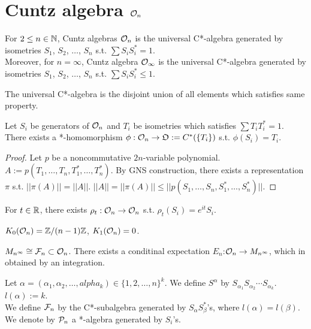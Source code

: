 \section{Cuntz algebra $\O_n$}

\cite{olesen1978some}
\begin{definition}
  For $ 2 \leq n \in \N$, Cuntz algebras $\O_n$ is the universal C*-algebra generated by isometries $S_1$, $S_2$, $\dots$, $S_n$ s.t. $\sum S_iS_i^* =1$. \\
  Moreover, for $n = \infty$, Cuntz algebra $\O_\infty$ is the universal C*-algebra generated by isometries $S_1$, $S_2$, $\dots$, $S_n$ s.t. $\sum S_iS_i^* \leq 1$. 
\end{definition}

The universal C*-algebra is the disjoint union of all elements which satisfies same property. 

\begin{proposition}[Universality]
  Let $S_i$ be generators of $\O_n$ and $T_i$ be isometries which satisfies $\sum T_iT_i^* =1$.
  There exists a *-homomorphism $\phi: \O_n \rightarrow \mathfrak{O} := C^*(\{T_i\})$ s.t. $\phi(S_i)=T_i$.
\end{proposition}

\begin{proof}
  Let $p$ be a noncommutative $2n$-variable polynomial.
  $A := p(T_1, \dots ,T_n, T_1^*, \dots , T_n^*)$.
  By GNS construction, there exists a representation $\pi$ s.t. $||\pi(A)||=||A||$.
  $||A|| = ||\pi(A)|| \leq ||p(S_1, \dots ,S_n, S_1^*, \dots , S_n^*)||$.
\end{proof}

\begin{remark}
  For $t \in \R$, there exists $\rho_t : \O_n \rightarrow \O_n$ s.t. $\rho_t(S_i) = e^{it}S_i$.
\end{remark}

\begin{theorem}
  $K_0(\O_n) = \Z/{(n-1)\Z}$, $K_1(\O_n)=0$.
\end{theorem}

\begin{proposition}
  $M_{n^\infty} \cong \F_n \subset \O_n$.
  There exists a conditinal expectation $E_n$:$\O_n \rightarrow M_{n^\infty}$, which in obtained by an integration.
\end{proposition}

\begin{definition}
  Let $\alpha = (\alpha_1, \alpha_2, \dots , alpha_k) \in \{1,2, \dots, n\}^{k}$.
  We define $S^\alpha$ by $S_{\alpha_1}S_{\alpha_2}\cdots S_{\alpha_k}$.
  $l(\alpha):= k$.\\
  We define $\F_n$ by the C*-subalgebra generated by $S_\alpha S_\beta^*$'s, where $l(\alpha)=l(\beta)$.\\
  We denote by $\P_n$ a *-algebra generated by $S_i$'s.
\end{definition}

